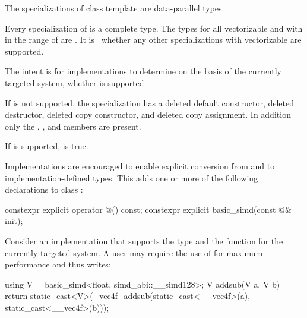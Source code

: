 \pnum
The specializations of class template  are data-parallel types.

\pnum
Every specialization of  is a complete type.
The types  for all vectorizable
 and with  in the range of \tcode{[1, 64]} are .
It is \impdef\ whether any other  specializations
with vectorizable  are supported.

\begin{note}
  The intent is for implementations to determine on the basis of the currently
  targeted system, whether  is supported.
\end{note}

If  is not supported, the specialization has a
deleted default constructor, deleted destructor, deleted copy constructor, and
deleted copy assignment.
In addition only the , , and
 members are present.

If  is supported,  is true.

\pnum
Implementations are encouraged to enable explicit conversion from and to
implementation-defined types. This adds one or more of the following
declarations to class :

\begin{codeblock}
constexpr explicit operator @\impdef@() const;
constexpr explicit basic_simd(const @\impdef@& init);
\end{codeblock}

\begin{example}
  Consider an implementation that supports the type  and the function  for the currently targeted system.
  A user may require the use of  for maximum performance and thus writes:
  \begin{codeblock}
    using V = basic_simd<float, simd_abi::__simd128>;
    V addsub(V a, V b) {
      return static_cast<V>(_vec4f_addsub(static_cast<__vec4f>(a), static_cast<__vec4f>(b)));
    }
  \end{codeblock}
\end{example}

